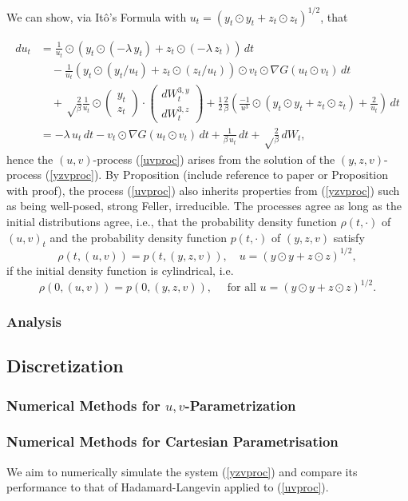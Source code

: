 \documentclass{article}
\begin{document}
We can show, via It\^{o}'s Formula with $u_t = (y_t \odot y_t + z_t \odot z_t)^{1/2}$, that 

$$
\begin{aligned}
  du_t&=\frac{1}{u_t}\odot(y_t\odot(-\lambda\,y_t)+z_t\odot(-\lambda\, z_t))\,dt\\&\quad
  -\frac{1}{u_t}(y_t\odot (y_t/u_t)+z_t\odot(z_t/u_t))\odot v_t\odot \nabla G(u_t\odot v_t)\,dt \\&\quad+\sqrt\frac{2}{\beta} \frac 1{u_t} \odot\begin{pmatrix}y_t\\z_t\end{pmatrix}
  \cdot\begin{pmatrix} dW_t^{3,y}\\ dW_t^{3,z}\end{pmatrix}
  + \frac 12 \frac{2}{\beta} \left(\frac{-1}{u^3}\odot(y_t\odot y_t+z_t\odot z_t)+\frac{2}{u_t}\right)\,dt\\
  &=-\lambda\,   u_t\,dt - v_t\odot \nabla G(u_t\odot v_t)\,dt
 +\frac{1}{\beta \,u_t}\,dt+ \sqrt\frac{2}{\beta}\,dW_t,
\end{aligned}
$$
hence the $(u,v)$-process (\ref{uvproc}) arises from the solution of the $(y,z,v)$-process (\ref{yzvproc}). By Proposition (include reference to paper or Proposition with proof), the process (\ref{uvproc}) also inherits properties from (\ref{yzvproc}) such as being well-posed, strong Feller, irreducible. The processes agree as long as the initial distributions agree, i.e., that the probability density function $\rho(t,\cdot)$ of $(u,v)_t$ and the probability density function $p(t,\cdot)$ of $(y,z,v)$ satisfy
\[\rho(t,(u,v)) = p(t,(y,z,v)), \quad u = (y \odot y + z \odot z)^{1/2},\]
if the initial density function is cylindrical, i.e.
\[\rho(0,(u,v)) = p(0,(y,z,v)), \quad \text{ for all } u = (y \odot y + z \odot z)^{1/2}.\]

\subsubsection{Analysis}

\subsection{Discretization}
\subsubsection{Numerical Methods for $u,v$-Parametrization}
\subsubsection{Numerical Methods for Cartesian Parametrisation}
We aim to numerically simulate the system (\ref{yzvproc}) and compare its performance to that of Hadamard-Langevin applied to (\ref{uvproc}). 
\end{document}
